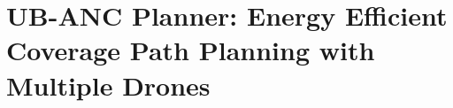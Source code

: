 \chapter{UB-ANC Planner: Energy Efficient Coverage Path Planning with Multiple Drones}\label{chap:planner}



